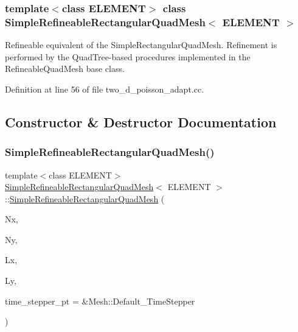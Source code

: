 \subsubsection*{template$<$class E\+L\+E\+M\+E\+NT$>$\newline
class Simple\+Refineable\+Rectangular\+Quad\+Mesh$<$ E\+L\+E\+M\+E\+N\+T $>$}

Refineable equivalent of the Simple\+Rectangular\+Quad\+Mesh. Refinement is performed by the Quad\+Tree-\/based procedures implemented in the Refineable\+Quad\+Mesh base class. 

Definition at line 56 of file two\+\_\+d\+\_\+poisson\+\_\+adapt.\+cc.



\subsection{Constructor \& Destructor Documentation}
\mbox{\label{classSimpleRefineableRectangularQuadMesh_ae0eab85a2c97fce00d7c82a613378e79}} 
\subsubsection{\texorpdfstring{Simple\+Refineable\+Rectangular\+Quad\+Mesh()}{SimpleRefineableRectangularQuadMesh()}}
{\footnotesize\ttfamily template$<$class E\+L\+E\+M\+E\+NT$>$ \\
\hyperlink{classSimpleRefineableRectangularQuadMesh}{Simple\+Refineable\+Rectangular\+Quad\+Mesh}$<$ E\+L\+E\+M\+E\+NT $>$\+::\hyperlink{classSimpleRefineableRectangularQuadMesh}{Simple\+Refineable\+Rectangular\+Quad\+Mesh} (\begin{DoxyParamCaption}\item[{const unsigned \&}]{Nx,  }\item[{const unsigned \&}]{Ny,  }\item[{const double \&}]{Lx,  }\item[{const double \&}]{Ly,  }\item[{Time\+Stepper $\ast$}]{time\+\_\+stepper\+\_\+pt = {\ttfamily \&Mesh\+:\+:Default\+\_\+TimeStepper} }\end{DoxyParamCaption})\hspace{0.3cm}{\ttfamily [inline]}}




